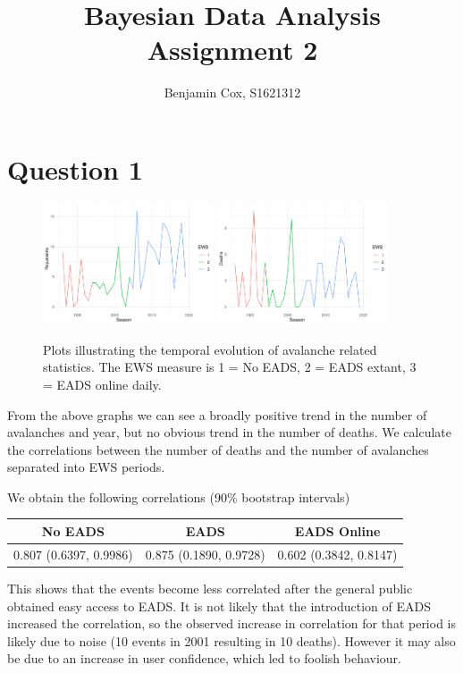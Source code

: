\documentclass[10pt]{extarticle}
\begin{document}
	
\title{Bayesian Data Analysis Assignment 2}
\author{Benjamin Cox, S1621312}
\date{\vspace{-5ex}}
\maketitle

\section*{Question 1}

\begin{figure}[H]
	\centering
	\includegraphics[width = 0.45\textwidth]{../ava_sea}
	\includegraphics[width = 0.45\textwidth]{../dea_sea}
	\caption{Plots illustrating the temporal evolution of avalanche related statistics. The EWS measure is 1 = No EADS, 2 = EADS extant, 3 = EADS online daily.}
	\label{fig:tempevava}
\end{figure}	

	From the above graphs we can see a broadly positive trend in the number of avalanches and year, but no obvious trend in the number of deaths. We calculate the correlations between the number of deaths and the number of avalanches separated into EWS periods. 
	
	We obtain the following correlations (90\% bootstrap intervals)
\begin{table}[H]
	\centering
	\begin{tabular}{c|c|c}
		\hline
		No EADS & EADS & EADS Online \\
		\hline
		0.807 (0.6397, 0.9986) & 0.875 (0.1890, 0.9728) & 0.602 (0.3842, 0.8147) \\
		\hline
	\end{tabular}
\end{table}
This shows that the events become less correlated after the general public obtained easy access to EADS. It is not likely that the introduction of EADS increased the correlation, so the observed increase in correlation for that period is likely due to noise (10 events in 2001 resulting in 10 deaths). However it may also be due to an increase in user confidence, which led to foolish behaviour.
\end{document}

